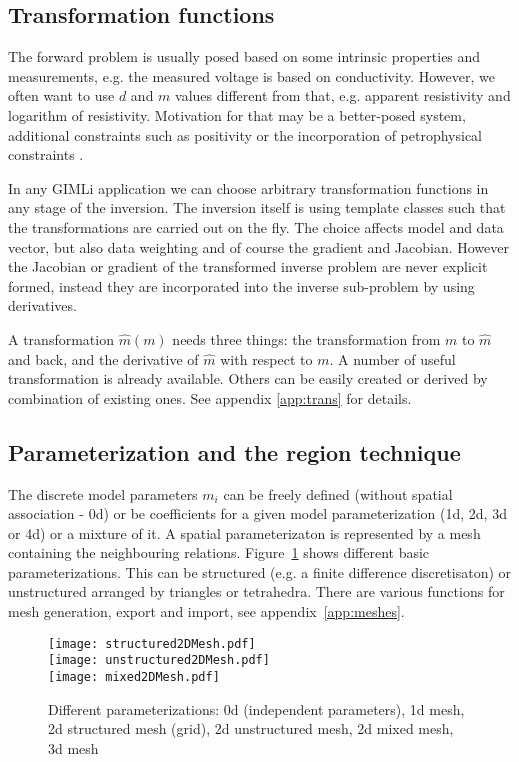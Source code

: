 \subsection{Transformation functions}\label{sec:introtrans}
The forward problem is usually posed based on some intrinsic properties and measurements, e.g. the measured voltage is based on  conductivity.
However, we often want to use $d$ and $m$ values different from that, e.g. apparent resistivity and logarithm of resistivity.
Motivation for that may be a better-posed system, additional constraints such as positivity or the incorporation of petrophysical constraints \citep{tarantola01,guerue08nearsurface}.

In any GIMLi application we can choose arbitrary transformation functions in any stage of the inversion.
The inversion itself is using template classes such that the transformations are carried out on the fly.
The choice affects model and data vector, but also data weighting and of course the gradient and Jacobian.
However the Jacobian or gradient of the transformed inverse problem are never explicit formed, instead they are incorporated into the inverse sub-problem by using derivatives.

A transformation $\hat m(m)$ needs three things: the transformation from $m$ to $\hat m$ and back, and the derivative of $\hat m$ with respect to $m$. A number of useful transformation is already available. Others can be easily created or derived by combination of existing ones. See appendix \ref{app:trans} for details.

\subsection{Parameterization and the region technique}\label{sec:parameter}
The discrete model parameters $m_i$ can be freely defined (without spatial association - 0d) or be coefficients for a given model parameterization (1d, 2d, 3d or 4d) or a mixture of it.
A spatial parameterizaton is represented by a mesh containing the neighbouring relations.
Figure~\ref{fig:para} shows different basic parameterizations.
This can be structured (e.g. a finite difference discretisaton) or unstructured arranged by triangles or tetrahedra.
There are various functions for mesh generation, export and import, see appendix~\ref{app:meshes}.

\begin{figure}[htbp]
\centering\texttt{[image: structured2DMesh.pdf]}\\
\centering\texttt{[image: unstructured2DMesh.pdf]}\\
\centering\texttt{[image: mixed2DMesh.pdf]}
\caption{Different parameterizations: 0d (independent parameters), 1d mesh, 2d structured mesh (grid), 2d unstructured mesh, 2d mixed mesh, 3d mesh}\label{fig:para}
\end{figure}

